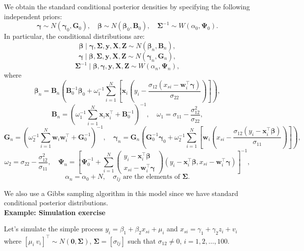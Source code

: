 We obtain the standard conditional posterior densities by specifying the following independent priors: 
\[
\bm{\gamma} \sim N(\bm{\gamma}_0, \bm{G}_0), \quad \bm{\beta} \sim N(\bm{\beta}_0, \bm{B}_0), \quad \bm{\Sigma}^{-1} \sim {W}(\alpha_0, \bm{\Psi}_0).
\]
In particular, the conditional distributions are:
\begin{equation*}
	\bm{\beta} \mid \bm{\gamma}, \bm{\Sigma}, \bm{y}, \bm{X}, \bm{Z} \sim N(\bm{\beta}_n, \bm{B}_n),
\end{equation*}
\begin{equation*}
	\bm{\gamma} \mid \bm{\beta}, \bm{\Sigma}, \bm{y}, \bm{X}, \bm{Z} \sim N(\bm{\gamma}_n, \bm{G}_n),
\end{equation*}
\begin{equation*}
	\bm{\Sigma}^{-1} \mid \bm{\beta}, \bm{\gamma}, \bm{y}, \bm{X}, \bm{Z} \sim {W}(\alpha_n, \bm{\Psi}_n),
\end{equation*}
where
\[
\bm{\beta}_n = \bm{B}_n \left( \bm{B}_0^{-1} \bm{\beta}_0 + \omega_1^{-1} \sum_{i=1}^{N} \left[ \bm{x}_i \left( y_i - \frac{\sigma_{12}(x_{si} - \bm{w}_i^{\top} \bm{\gamma})}{\sigma_{22}} \right) \right] \right),
\]
\[
\bm{B}_n = \left( \omega_1^{-1} \sum_{i=1}^{N} \bm{x}_i \bm{x}_i^{\top} + \bm{B}_0^{-1} \right)^{-1}, \quad \omega_1 = \sigma_{11} - \frac{\sigma_{12}^2}{\sigma_{22}},
\]
\[
\bm{G}_n = \left( \omega_2^{-1} \sum_{i=1}^{N} \bm{w}_i \bm{w}_i^{\top} + \bm{G}_0^{-1} \right)^{-1}, \quad \bm{\gamma}_n = \bm{G}_n \left( \bm{G}_0^{-1} \bm{\gamma}_0 + \omega_2^{-1} \sum_{i=1}^{N} \left[ \bm{w}_i \left( x_{si} - \frac{\sigma_{12} (y_i - \bm{x}_i^{\top} \bm{\beta})}{\sigma_{11}} \right) \right] \right),
\]
\[
\omega_2 = \sigma_{22} - \frac{\sigma_{12}^2}{\sigma_{11}}, \quad \bm{\Psi}_n = \left[ \bm{\Psi}_0^{-1} + \sum_{i=1}^N \begin{pmatrix} y_i - \bm{x}_i^{\top} \bm{\beta} \\ x_{si} - \bm{w}_i^{\top} \bm{\gamma} \end{pmatrix} (y_i - \bm{x}_i^{\top} \bm{\beta}, x_{si} - \bm{w}_i^{\top} \bm{\gamma}) \right]^{-1},
\]
\[
\alpha_n = \alpha_0 + N, \quad \sigma_{lj} \text{ are the elements of } \bm{\Sigma}.
\]

We also use a Gibbs sampling algorithm in this model since we have standard conditional posterior distributions.\\

\textbf{Example: Simulation exercise}

Let's simulate the simple process $y_i=\beta_1+\beta_2x_{si}+\mu_i$ and $x_{si}=\gamma_1+\gamma_2z_i+v_i$ where $[\mu_i \ v_i]^{\top}\sim N(\bm{0},\bm{\Sigma})$, $\bm{\Sigma}=[\sigma_{lj}]$ such that $\sigma_{12}\neq 0$, $i=1,2,\dots,100$.

